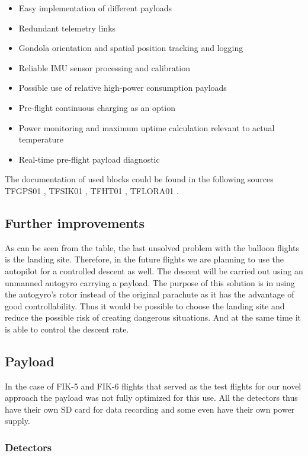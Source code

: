 \documentclass{Rpd}
\begin{document}
\begin{itemize}
\item Easy implementation of different payloads
\item Redundant telemetry links
\item Gondola orientation and spatial position tracking and logging
\item Reliable IMU sensor processing and calibration
\item Possible use of relative high-power consumption payloads
\item Pre-flight continuous charging as an option
\item Power monitoring and maximum uptime calculation relevant to actual temperature
\item Real-time pre-flight payload diagnostic
\end{itemize}

The documentation of used blocks could be found in the following sources TFGPS01 \cite{TFGPS01}, TFSIK01 \cite{TFSIK01}, TFHT01 \cite{TFHT01}, TFLORA01 \cite{TFLORA01}.


\subsection{Further improvements}

As can be seen from the table, the last unsolved problem with the balloon flights is the landing site. Therefore, in the future flights we are planning to use the autopilot for a controlled descent as well.
The descent will be carried out using an unmanned autogyro carrying a payload. The purpose of this solution is in using the autogyro’s rotor instead of the original parachute as it has the advantage of good controllability. Thus it would be possible to choose the landing site and reduce the possible risk of creating dangerous situations. And at the same time it is able to control the descent rate. 


\subsection{Payload}
In the case of FIK-5 and FIK-6 flights that served as the test flights for our novel approach the payload was not fully optimized for this use. All the detectors thus have their own SD card for data recording and some even have their own power supply.


\subsubsection{Detectors}
\end{document}
